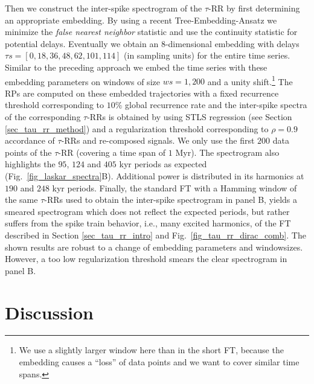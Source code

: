 \documentclass[entropy,article,submit,pdftex,moreauthors]{Definitions/mdpi}
\begin{document}
\noindent Then we construct the inter-spike spectrogram of the $\tau$-RR by first determining an appropriate embedding. By using a recent Tree-Embedding-Ansatz \cite{Kraemer2022} we minimize the 
\textit{false nearest neighbor} statistic \cite{hegger1999} and use the continuity statistic \cite{pecora2007} for potential delays. Eventually we obtain an $8$-dimensional embedding 
with delays $\tau s=[0, 18, 36, 48, 62, 101, 114]$ (in sampling units) for the entire time series. Similar to the preceding approach we embed the time series with these embedding parameters 
on windows of size $ws=1,200$ and a unity shift.\footnote{We use a slightly larger window here than in the short FT, because the embedding causes a ``loss'' of data points and we want to 
cover similar time spans.} The RPs are computed on these embedded trajectories with a fixed recurrence threshold corresponding to $10\%$ global recurrence rate \cite{kraemer2018} 
and the inter-spike spectra of the corresponding $\tau$-RRs is obtained by using STLS regression (see Section \ref{sec_tau_rr_method}) and a regularization threshold corresponding to 
$\rho=0.9$ accordance of $\tau$-RRs and re-composed signals. We only use the first $200$ data points of the $\tau$-RR (covering a time span of $1$ Myr). 
The spectrogram also highlights the $95$, $124$ and $405$ kyr periods as expected (Fig.~\ref{fig_laskar_spectra}B). 
Additional power is distributed in its harmonics at $190$ and $248$ kyr periods. Finally, the standard FT with a Hamming window of the same $\tau$-RRs used to obtain the inter-spike 
spectrogram in panel B, yields a smeared spectrogram which does not reflect the expected periods, but rather suffers from the spike train behavior, i.e., many excited harmonics, of the 
FT described in Section \ref{sec_tau_rr_intro} and Fig.~\ref{fig_tau_rr_dirac_comb}. The shown results are robust to a change of embedding parameters and windowsizes. However, a too low 
regularization threshold smears the clear spectrogram in panel B.


\section{Discussion}\label{sec_tau_rr_discussion}
\end{document}
